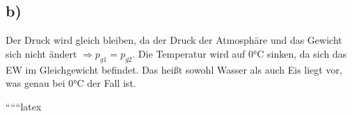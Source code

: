 

\subsection*{b)}

Der Druck wird gleich bleiben, da der Druck der Atmosphäre und das Gewicht sich nicht ändert $\Rightarrow p_{g1} = p_{g2}$. Die Temperatur wird auf 0°C sinken, da sich das EW im Gleichgewicht befindet. Das heißt sowohl Wasser als auch Eis liegt vor, was genau bei 0°C der Fall ist.

``````latex